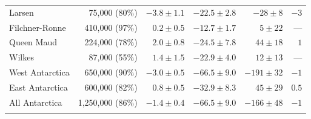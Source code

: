 \begin{footnotesize}
\begin{longtable}{lrrrrr}
Larsen  	& 75,000    (80\%) & $-3.8  \pm 1.1$ & $-22.5 \pm 2.8 $ & $-28  \pm 8 $ & $-3  $ \\
Filchner-Ronne  & 410,000   (97\%) & $0.2   \pm 0.5$ & $-12.7 \pm 1.7 $ & $5    \pm 22$ &  ---   \\
Queen Maud 	& 224,000   (78\%) & $2.0   \pm 0.8$ & $-24.5 \pm 7.8 $ & $44   \pm 18$ & $1   $ \\
Wilkes  	& 87,000    (55\%) & $1.4   \pm 1.5$ & $-22.9 \pm 4.0 $ & $12   \pm 13$ &  ---   \\
West Antarctica & 650,000   (90\%) & $-3.0  \pm 0.5$ & $-66.5 \pm 9.0 $ & $-191 \pm 32$ & $-1  $ \\
East Antarctica & 600,000   (82\%) & $0.8   \pm 0.5$ & $-32.9 \pm 8.3 $ & $45   \pm 29$ & $0.5 $ \\
All Antarctica  & 1,250,000 (86\%) & $-1.4  \pm 0.4$ & $-66.5 \pm 9.0 $ & $-166 \pm 48$ & $-1  $ \\[-.55cm]
%
\label{tab:estimates}
\end{longtable}
\end{footnotesize}


